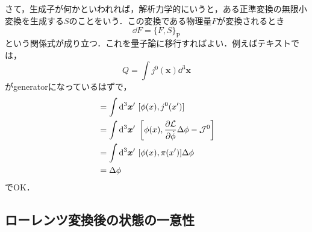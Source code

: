 \documentclass[a4paper,pdflatex,ja=standard]{bxjsarticle}
\begin{document}
さて，生成子が何かといわれれば，解析力学的にいうと，ある正準変換の無限小変換を生成する$S$のことをいう．この変換である物理量$F$が変換されるとき
\begin{equation}
  \dd F
  =
  \{ F,S \}_{\text{P}}
\end{equation}
という関係式が成り立つ．これを量子論に移行すればよい．例えばテキストでは，
\begin{equation}
  Q
  =
  \int j^{0}(\bm{x}) \dd^3 \bm{x}
\end{equation}
がgeneratorになっているはずで，
\begin{align}
  [\phi,Q]
  &=
  \int \dd^3 \bm{x}^{\prime}\ [\phi(x),j^{0}(x^{\prime})]
  \nonumber
  \\
  &=
  \int \dd^3 \bm{x}^{\prime}\ 
  \left[  
    \phi(x),\pdv{\mathcal{L}}{\dot{\phi}}\Delta\phi-\mathcal{J}^{0}
  \right]
  \nonumber
  \\
  &=
  \int \dd^3 \bm{x}^{\prime}\ [ \phi(x),\pi(x') ]\Delta\phi
  \nonumber
  \\
  &=\Delta\phi
\end{align}
でOK．

\subsection{ローレンツ変換後の状態の一意性}
\end{document}
